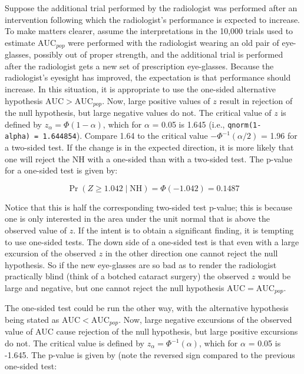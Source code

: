 \documentclass[
]{book}
\begin{document}
Suppose the additional trial performed by the radiologist was performed after an intervention following which the radiologist's performance is expected to increase. To make matters clearer, assume the interpretations in the 10,000 trials used to estimate \(\text{AUC}_{pop}\) were performed with the radiologist wearing an old pair of eye-glasses, possibly out of proper strength, and the additional trial is performed after the radiologist gets a new set of prescription eye-glasses. Because the radiologist's eyesight has improved, the expectation is that performance should increase. In this situation, it is appropriate to use the one-sided alternative hypothesis \(\text{AUC} > \text{AUC}_{pop}\). Now, large positive values of \(z\) result in rejection of the null hypothesis, but large negative values do not. The critical value of \(z\) is defined by \(z_\alpha = \Phi\left ( 1-\alpha \right )\), which for \(\alpha\) = 0.05 is 1.645 (i.e., \texttt{qnorm(1-alpha)\ =\ 1.644854}). Compare 1.64 to the critical value \(-\Phi^{-1}\left ( {\alpha/2} \right)\) = 1.96 for a two-sided test. If the change is in the expected direction, it is more likely that one will reject the NH with a one-sided than with a two-sided test. The p-value for a one-sided test is given by:

\begin{equation*} 
\Pr\left ( Z \geq 1.042 \mid \text{NH} \right ) = \Phi \left (-1.042  \right ) = 0.1487
\end{equation*}

Notice that this is half the corresponding two-sided test p-value; this is because one is only interested in the area under the unit normal that is above the observed value of \(z\). If the intent is to obtain a significant finding, it is tempting to use one-sided tests. The down side of a one-sided test is that even with a large excursion of the observed \(z\) in the other direction one cannot reject the null hypothesis. So if the new eye-glasses are so bad as to render the radiologist practically blind (think of a botched cataract surgery) the observed \(z\) would be large and negative, but one cannot reject the null hypothesis \(\text{AUC}=\text{AUC}_{pop}\).

The one-sided test could be run the other way, with the alternative hypothesis being stated as \(\text{AUC}<\text{AUC}_{pop}\). Now, large negative excursions of the observed value of AUC cause rejection of the null hypothesis, but large positive excursions do not. The critical value is defined by \(z_\alpha = \Phi^{-1}\left (\alpha \right )\), which for \(\alpha\) = 0.05 is -1.645. The p-value is given by (note the reversed sign compared to the previous one-sided test:
\end{document}
